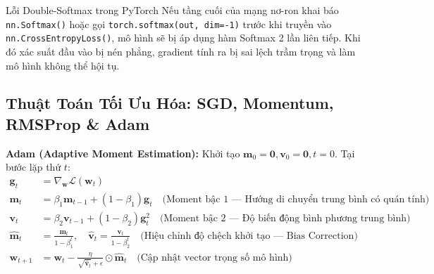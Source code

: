 \documentclass[10pt,a4paper]{article}
\begin{document}
\begin{trapbox}{Lỗi Double-Softmax trong PyTorch}
Nếu tầng cuối của mạng nơ-ron khai báo \texttt{nn.Softmax()} hoặc gọi \texttt{torch.softmax(out, dim=-1)} trước khi truyền vào \texttt{nn.CrossEntropyLoss()}, mô hình sẽ bị áp dụng hàm Softmax 2 lần liên tiếp. Khi đó xác suất đầu vào bị nén phẳng, gradient tính ra bị sai lệch trầm trọng và làm mô hình không thể hội tụ.
\end{trapbox}

\subsection{Thuật Toán Tối Ưu Hóa: SGD, Momentum, RMSProp \& Adam}
\textbf{Adam (Adaptive Moment Estimation):} Khởi tạo $\mathbf{m}_0 = \mathbf{0}, \mathbf{v}_0 = \mathbf{0}, t = 0$. Tại bước lặp thứ $t$:
\begin{align}
    \mathbf{g}_t &= \nabla_\mathbf{w} \mathcal{L}(\mathbf{w}_t) \\
    \mathbf{m}_t &= \beta_1 \mathbf{m}_{t-1} + (1 - \beta_1) \mathbf{g}_t \quad \text{(Moment bậc 1 --- Hướng di chuyển trung bình có quán tính)} \\
    \mathbf{v}_t &= \beta_2 \mathbf{v}_{t-1} + (1 - \beta_2) \mathbf{g}_t^2 \quad \text{(Moment bậc 2 --- Độ biến động bình phương trung bình)} \\
    \hat{\mathbf{m}}_t &= \frac{\mathbf{m}_t}{1 - \beta_1^t}, \quad \hat{\mathbf{v}}_t = \frac{\mathbf{v}_t}{1 - \beta_2^t} \quad \text{(Hiệu chỉnh độ chệch khởi tạo --- Bias Correction)} \\
    \mathbf{w}_{t+1} &= \mathbf{w}_t - \frac{\eta}{\sqrt{\hat{\mathbf{v}}_t} + \epsilon} \odot \hat{\mathbf{m}}_t \quad \text{(Cập nhật vector trọng số mô hình)}
\end{align}
\end{document}
